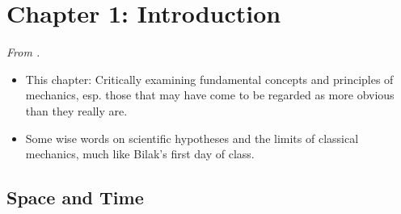 \documentclass[../notes.tex]{subfiles}
\begin{document}
\section{Chapter 1: Introduction}
\emph{From \textcite{bib:KibbleBerkshire}.}
\begin{itemize}
    \item {}This chapter: Critically examining fundamental concepts and principles of mechanics, esp. those that may have come to be regarded as more obvious than they really are.
    \item Some wise words on scientific hypotheses and the limits of classical mechanics, much like Bilak's first day of class.
\end{itemize}


\subsection*{Space and Time}
\end{document}
